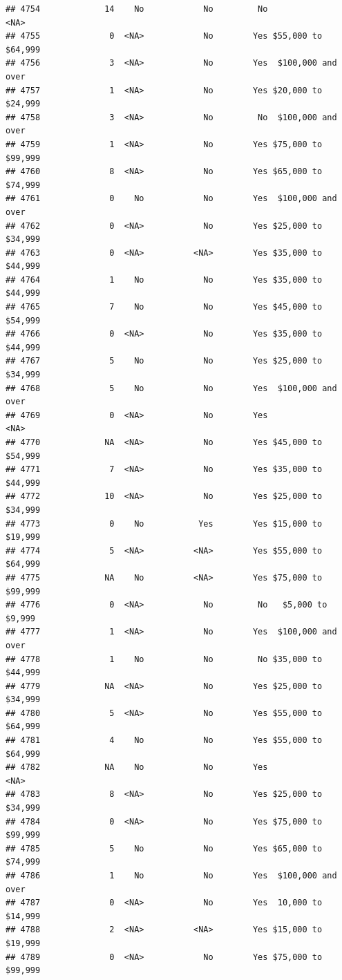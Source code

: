 \documentclass[man]{apa6}
\begin{document}
\begin{verbatim}
## 4754             14    No            No         No               <NA>
## 4755              0  <NA>            No        Yes $55,000 to $64,999
## 4756              3  <NA>            No        Yes  $100,000 and over
## 4757              1  <NA>            No        Yes $20,000 to $24,999
## 4758              3  <NA>            No         No  $100,000 and over
## 4759              1  <NA>            No        Yes $75,000 to $99,999
## 4760              8  <NA>            No        Yes $65,000 to $74,999
## 4761              0    No            No        Yes  $100,000 and over
## 4762              0  <NA>            No        Yes $25,000 to $34,999
## 4763              0  <NA>          <NA>        Yes $35,000 to $44,999
## 4764              1    No            No        Yes $35,000 to $44,999
## 4765              7    No            No        Yes $45,000 to $54,999
## 4766              0  <NA>            No        Yes $35,000 to $44,999
## 4767              5    No            No        Yes $25,000 to $34,999
## 4768              5    No            No        Yes  $100,000 and over
## 4769              0  <NA>            No        Yes               <NA>
## 4770             NA  <NA>            No        Yes $45,000 to $54,999
## 4771              7  <NA>            No        Yes $35,000 to $44,999
## 4772             10  <NA>            No        Yes $25,000 to $34,999
## 4773              0    No           Yes        Yes $15,000 to $19,999
## 4774              5  <NA>          <NA>        Yes $55,000 to $64,999
## 4775             NA    No          <NA>        Yes $75,000 to $99,999
## 4776              0  <NA>            No         No   $5,000 to $9,999
## 4777              1  <NA>            No        Yes  $100,000 and over
## 4778              1    No            No         No $35,000 to $44,999
## 4779             NA  <NA>            No        Yes $25,000 to $34,999
## 4780              5  <NA>            No        Yes $55,000 to $64,999
## 4781              4    No            No        Yes $55,000 to $64,999
## 4782             NA    No            No        Yes               <NA>
## 4783              8  <NA>            No        Yes $25,000 to $34,999
## 4784              0  <NA>            No        Yes $75,000 to $99,999
## 4785              5    No            No        Yes $65,000 to $74,999
## 4786              1    No            No        Yes  $100,000 and over
## 4787              0  <NA>            No        Yes  10,000 to $14,999
## 4788              2  <NA>          <NA>        Yes $15,000 to $19,999
## 4789              0  <NA>            No        Yes $75,000 to $99,999

\end{verbatim}
\end{document}
